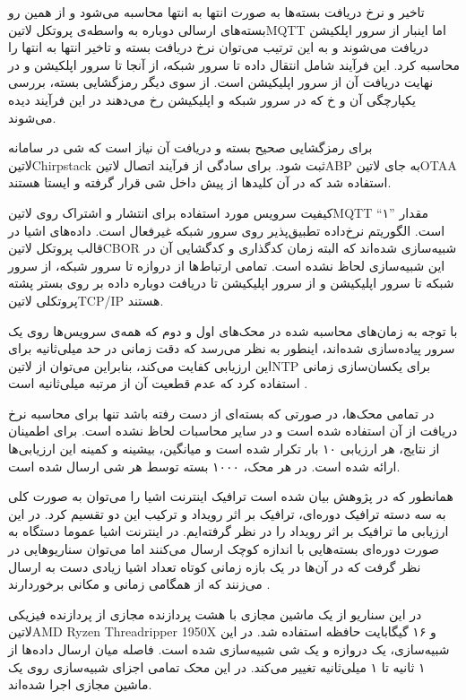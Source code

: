 تاخیر و نرخ دریافت بسته‌ها به صورت انتها به انتها محاسبه می‌شود و از همین رو بسته‌های ارسالی دوباره به واسطه‌ی پروتکل ‌لاتین{MQTT} اما اینبار از سرور اپلکیشن
دریافت می‌شوند و به این ترتیب می‌توان نرخ دریافت بسته و تاخیر انتها به انتها را محاسبه کرد. این فرآیند شامل انتقال داده تا سرور شبکه، از آنجا تا سرور اپلکیشن و در نهایت
دریافت آن از سرور اپلیکیشن است. از سوی دیگر رمزگشایی بسته، بررسی یکپارچگی آن و ‌خ که در سرور شبکه و اپلیکیشن رخ می‌دهند در این فرآیند دیده می‌شوند.

برای رمزگشایی صحیح بسته و دریافت آن نیاز است
که شی در سامانه ‌لاتین{Chirpstack} ثبت شود. برای سادگی از فرآیند اتصال ‌لاتین{ABP} به جای ‌لاتین{OTAA} استفاده شد که در آن کلیدها از پیش
داخل شی قرار گرفته و ایستا هستند.

کیفیت سرویس مورد استفاده برای انتشار و اشتراک روی ‌لاتین{MQTT} مقدار ''۱`` است. الگوریتم نرخ‌داده تطبیق‌پذیر روی سرور شبکه غیرفعال است.
داده‌های اشیا در قالب پروتکل ‌لاتین{CBOR} شبیه‌سازی شده‌اند که البته زمان کدگذاری و کدگشایی آن در این شبیه‌سازی لحاظ نشده است.
تمامی ارتباط‌ها از دروازه تا سرور شبکه، از سرور شبکه تا سرور اپلیکیشن و از سرور اپلیکیشن تا دریافت دوباره داده
بر روی بستر پشته پروتکلی ‌لاتین{TCP/IP} هستند.

با توجه به زمان‌های محاسبه شده در محک‌های اول و دوم که همه‌ی سرویس‌ها روی یک سرور پیاده‌سازی شده‌اند، اینطور به نظر می‌رسد که دقت زمانی در حد میلی‌ثانیه
برای این ارزیابی کفایت می‌کند، بنابراین می‌توان از ‌لاتین{NTP} برای یکسان‌سازی زمانی استفاده کرد که عدم قطعیت آن از مرتبه میلی‌ثانیه است .

در تمامی محک‌ها، در صورتی که بسته‌ای از دست رفته باشد تنها برای محاسبه نرخ دریافت از آن استفاده شده است و در سایر محاسبات لحاظ نشده است.
برای اطمینان از نتایج، هر ارزیابی ۱۰ بار تکرار شده است و میانگین، بیشینه و کمینه این ارزیابی‌ها ارائه شده است. در هر محک، ۱۰۰۰ بسته توسط هر شی ارسال شده است.

همانطور که در پژوهش  بیان شده است ترافیک اینترنت اشیا را می‌توان به صورت کلی به سه دسته ترافیک دوره‌ای، ترافیک بر اثر رویداد و ترکیب این دو تقسیم کرد.
در این ارزیابی ما ترافیک بر اثر رویداد را در نظر گرفته‌ایم.
در اینترنت اشیا عموما دستگاه به صورت دوره‌ای بسته‌هایی با اندازه کوچک ارسال می‌کنند اما می‌توان سناریوهایی در نظر گرفت که در آن‌ها در یک بازه زمانی کوتاه
تعداد اشیا زیادی دست به ارسال می‌زنند که از همگامی زمانی و مکانی برخوردارند .


در این سناریو از یک ماشین مجازی با هشت پردازنده مجازی از پردازنده فیزیکی
‌لاتین{AMD Ryzen Threadripper 1950X}
و ۱۶ گیگابایت حافظه استفاده شد.
در این شبیه‌سازی، یک دروازه و یک شی شبیه‌سازی شده است. فاصله میان ارسال داده‌ها از ۱ ثانیه تا ۱ میلی‌ثانیه تغییر می‌کند.
در این محک تمامی اجزای شبیه‌سازی روی یک ماشین مجازی اجرا شده‌اند.


